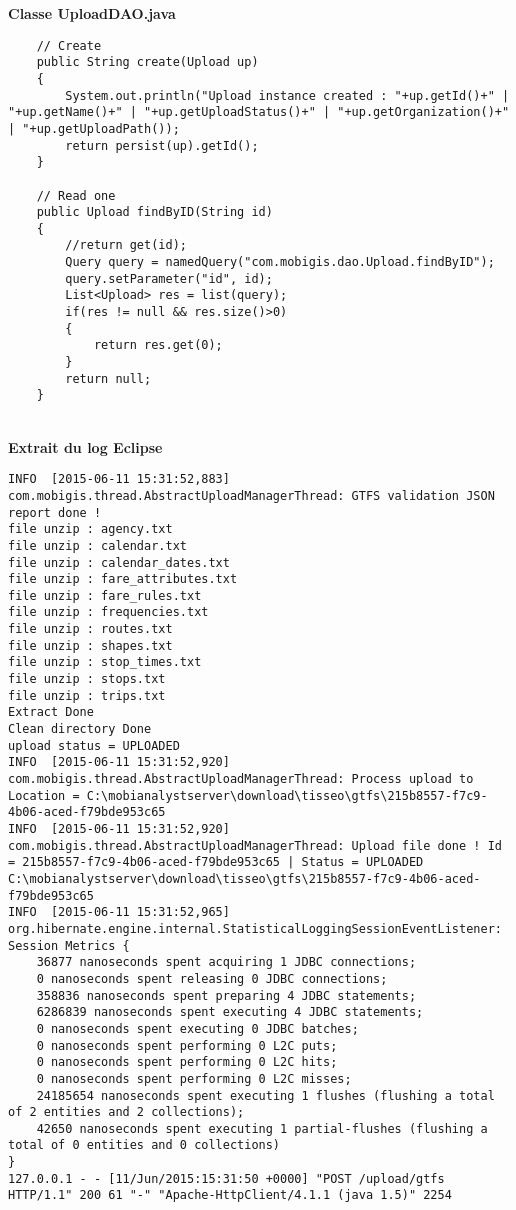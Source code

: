 \textbf{Classe UploadDAO.java}\\

\begin{lstlisting}
	// Create 
    public String create(Upload up)
    {
        System.out.println("Upload instance created : "+up.getId()+" | "+up.getName()+" | "+up.getUploadStatus()+" | "+up.getOrganization()+" | "+up.getUploadPath());
        return persist(up).getId();
    }

    // Read one
    public Upload findByID(String id)
    {
        //return get(id);
        Query query = namedQuery("com.mobigis.dao.Upload.findByID");
        query.setParameter("id", id);
        List<Upload> res = list(query);
        if(res != null && res.size()>0)
        {
            return res.get(0);
        }
        return null;
    }
\end{lstlisting} \\


\textbf{Extrait du log Eclipse}\\

\begin{lstlisting}
INFO  [2015-06-11 15:31:52,883] com.mobigis.thread.AbstractUploadManagerThread: GTFS validation JSON report done !
file unzip : agency.txt
file unzip : calendar.txt
file unzip : calendar_dates.txt
file unzip : fare_attributes.txt
file unzip : fare_rules.txt
file unzip : frequencies.txt
file unzip : routes.txt
file unzip : shapes.txt
file unzip : stop_times.txt
file unzip : stops.txt
file unzip : trips.txt
Extract Done
Clean directory Done
upload status = UPLOADED
INFO  [2015-06-11 15:31:52,920] com.mobigis.thread.AbstractUploadManagerThread: Process upload to Location = C:\mobianalystserver\download\tisseo\gtfs\215b8557-f7c9-4b06-aced-f79bde953c65
INFO  [2015-06-11 15:31:52,920] com.mobigis.thread.AbstractUploadManagerThread: Upload file done ! Id = 215b8557-f7c9-4b06-aced-f79bde953c65 | Status = UPLOADED
C:\mobianalystserver\download\tisseo\gtfs\215b8557-f7c9-4b06-aced-f79bde953c65
INFO  [2015-06-11 15:31:52,965] org.hibernate.engine.internal.StatisticalLoggingSessionEventListener: Session Metrics {
    36877 nanoseconds spent acquiring 1 JDBC connections;
    0 nanoseconds spent releasing 0 JDBC connections;
    358836 nanoseconds spent preparing 4 JDBC statements;
    6286839 nanoseconds spent executing 4 JDBC statements;
    0 nanoseconds spent executing 0 JDBC batches;
    0 nanoseconds spent performing 0 L2C puts;
    0 nanoseconds spent performing 0 L2C hits;
    0 nanoseconds spent performing 0 L2C misses;
    24185654 nanoseconds spent executing 1 flushes (flushing a total of 2 entities and 2 collections);
    42650 nanoseconds spent executing 1 partial-flushes (flushing a total of 0 entities and 0 collections)
}
127.0.0.1 - - [11/Jun/2015:15:31:50 +0000] "POST /upload/gtfs HTTP/1.1" 200 61 "-" "Apache-HttpClient/4.1.1 (java 1.5)" 2254
\end{lstlisting} 